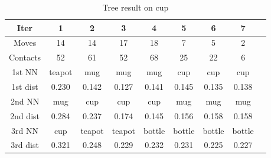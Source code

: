 \documentclass[letterpaper, 10 pt, conference]{ieeeconf}  %
\begin{document}
\begin{table}[thbp]
  \begin{center}
  \begin{tabulary}{.8\linewidth}{c | c c c c c c c c}
    Iter		& 1		& 2		& 3		& 4		& 5		& 6		& 7 \\ \hline
    Moves		& 14	& 14	& 17	& 18	& 7		& 5		& 2 \\
    Contacts	& 52	& 61	& 52	& 68	& 25	& 22	& 6 \\
    \hline
    1st NN		& teapot& mug	& mug	& mug	& cup	& cup	& cup \\
    1st dist	& 0.230	& 0.142	& 0.127	& 0.141	& 0.145	& 0.135	& 0.138 \\
    \hline
	2nd NN		& mug	& cup	& cup	& cup	& mug	& mug	& mug \\
	2nd dist	& 0.284	& 0.237	& 0.174	& 0.145	& 0.156	& 0.158	& 0.158 \\
    \hline
	3rd NN		& cup	&teapot	&teapot	&bottle	&bottle	&bottle	&bottle \\
	3rd dist	& 0.321	& 0.248	& 0.229	& 0.232	& 0.231	& 0.225	& 0.227
  \end{tabulary}
  \caption{\label{tab:nn} Tree result on cup}
  \end{center}
  \vspace{-5mm}
\end{table}







\end{document}
